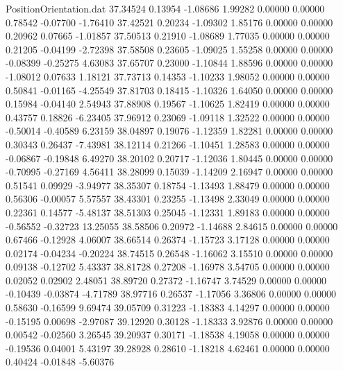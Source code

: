 \begin{filecontents}{PositionOrientation.dat}
  37.34524    0.13954   -1.08686     1.99282    0.00000    0.00000    0.78542   -0.07700   -1.76410
  37.42521    0.20234   -1.09302     1.85176    0.00000    0.00000    0.20962    0.07665   -1.01857
  37.50513    0.21910   -1.08689     1.77035    0.00000    0.00000    0.21205   -0.04199   -2.72398
  37.58508    0.23605   -1.09025     1.55258    0.00000    0.00000   -0.08399   -0.25275    4.63083
  37.65707    0.23000   -1.10844     1.88596    0.00000    0.00000   -1.08012    0.07633    1.18121
  37.73713    0.14353   -1.10233     1.98052    0.00000    0.00000    0.50841   -0.01165   -4.25549
  37.81703    0.18415   -1.10326     1.64050    0.00000    0.00000    0.15984   -0.04140    2.54943
  37.88908    0.19567   -1.10625     1.82419    0.00000    0.00000    0.43757    0.18826   -6.23405
  37.96912    0.23069   -1.09118     1.32522    0.00000    0.00000   -0.50014   -0.40589    6.23159
  38.04897    0.19076   -1.12359     1.82281    0.00000    0.00000    0.30343    0.26437   -7.43981
  38.12114    0.21266   -1.10451     1.28583    0.00000    0.00000   -0.06867   -0.19848    6.49270
  38.20102    0.20717   -1.12036     1.80445    0.00000    0.00000   -0.70995   -0.27169    4.56411
  38.28099    0.15039   -1.14209     2.16947    0.00000    0.00000    0.51541    0.09929   -3.94977
  38.35307    0.18754   -1.13493     1.88479    0.00000    0.00000    0.56306   -0.00057    5.57557
  38.43301    0.23255   -1.13498     2.33049    0.00000    0.00000    0.22361    0.14577   -5.48137
  38.51303    0.25045   -1.12331     1.89183    0.00000    0.00000   -0.56552   -0.32723   13.25055
  38.58506    0.20972   -1.14688     2.84615    0.00000    0.00000    0.67466   -0.12928    4.06007
  38.66514    0.26374   -1.15723     3.17128    0.00000    0.00000    0.02174   -0.04234   -0.20224
  38.74515    0.26548   -1.16062     3.15510    0.00000    0.00000    0.09138   -0.12702    5.43337
  38.81728    0.27208   -1.16978     3.54705    0.00000    0.00000    0.02052    0.02902    2.48051
  38.89720    0.27372   -1.16747     3.74529    0.00000    0.00000   -0.10439   -0.03874   -4.71789
  38.97716    0.26537   -1.17056     3.36806    0.00000    0.00000    0.58630   -0.16599    9.69474
  39.05709    0.31223   -1.18383     4.14297    0.00000    0.00000   -0.15195    0.00698   -2.97087
  39.12920    0.30128   -1.18333     3.92876    0.00000    0.00000    0.00542   -0.02560    3.26545
  39.20937    0.30171   -1.18538     4.19058    0.00000    0.00000   -0.19536    0.04001    5.43197
  39.28928    0.28610   -1.18218     4.62461    0.00000    0.00000    0.40424   -0.01848   -5.60376

\end{filecontents}
